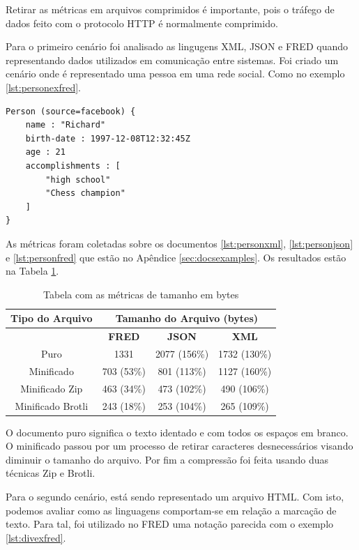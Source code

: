 Retirar as métricas em arquivos comprimidos é importante, pois o tráfego de dados feito
com o protocolo HTTP é normalmente comprimido.

Para o primeiro cenário foi analisado as lingugens XML, JSON e FRED quando representando dados
utilizados em comunicação entre sistemas. Foi criado um cenário onde é representado 
uma pessoa em uma rede social. Como no exemplo \ref{lst:personexfred}.

\begin{lstlisting}[caption=Exemplo de dado sobre uma pessoa ,label={lst:personexfred}]
Person (source=facebook) {
    name : "Richard"
    birth-date : 1997-12-08T12:32:45Z
    age : 21
    accomplishments : [
        "high school"
        "Chess champion"
    ]
}
\end{lstlisting}

As métricas foram coletadas sobre os documentos \ref{lst:personxml}, \ref{lst:personjson} e
\ref{lst:personfred} que estão no Apêndice \ref{sec:docsexamples}. Os resultados estão 
na Tabela \ref{tbl:persondocs}. 

\begin{table}[h]
    \centering
	\caption{Tabela com as métricas de tamanho em bytes}
	\label{tbl:persondocs}
    \begin{tabular}{cccc}
        \toprule
        \multicolumn{1}{c}{\textbf{Tipo do Arquivo}} & \multicolumn{3}{c}{\textbf{Tamanho do Arquivo (bytes)}} \\
        \midrule
                                                     & \textbf{FRED} & \textbf{JSON} & \textbf{XML}    \\
        \midrule
        Puro              & 1331       & 2077 (156\%) & 1732 (130\%) \\
		Minificado        & 703 (53\%) & 801  (113\%) & 1127 (160\%) \\
        Minificado Zip    & 463 (34\%) & 473  (102\%) & 490  (106\%) \\
        Minificado Brotli & 243 (18\%) & 253  (104\%) & 265  (109\%) \\
		\bottomrule
    \end{tabular}
\end{table}

O documento puro significa o texto identado e com todos os espaços em branco.
O minificado passou por um processo de retirar caracteres desnecessários visando
diminuir o tamanho do arquivo. Por fim a compressão foi feita usando duas técnicas
Zip e Brotli. 

Para o segundo cenário, está sendo representado um arquivo HTML. Com isto, podemos avaliar
como as linguagens comportam-se em relação a marcação de texto. Para tal,
foi utilizado no FRED uma notação parecida com o exemplo \ref{lst:divexfred}.

